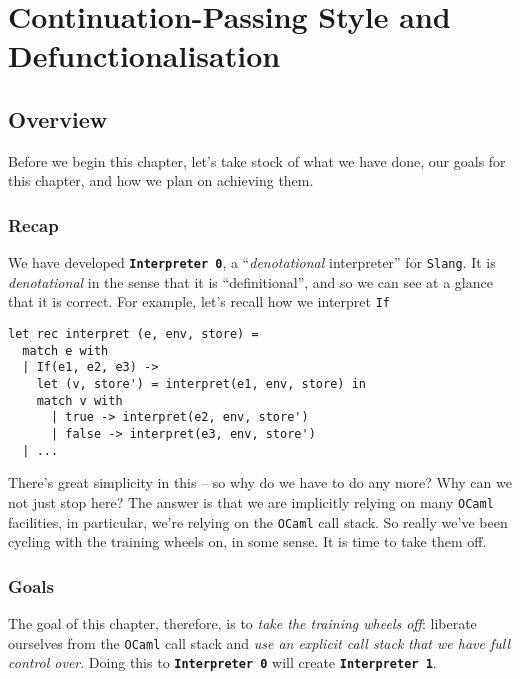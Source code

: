 \chapter{Continuation-Passing Style and Defunctionalisation}



\section{Overview}
Before we begin this chapter, let's take stock of what we have done, our goals for this chapter, and how we plan on achieving them. 

\subsection{Recap}
We have developed \textbf{\texttt{Interpreter 0}}, a ``\emph{denotational} interpreter'' for \texttt{Slang}. It is \emph{denotational} in the sense that it is ``definitional'', and so we can see at a glance that it is correct. For example, let's recall how we interpret \texttt{If}

\begin{code}
\begin{verbatim}
let rec interpret (e, env, store) =
  match e with
  | If(e1, e2, e3) -> 
    let (v, store') = interpret(e1, env, store) in
    match v with 
      | true -> interpret(e2, env, store')
      | false -> interpret(e3, env, store')
  | ...
\end{verbatim}
\end{code}

There's great simplicity in this -- so why do we have to do any more? Why can we not just stop here? The answer is that we are implicitly relying on many \texttt{OCaml} facilities, in particular, we're relying on the \texttt{OCaml} call stack. So really we've been cycling with the training wheels on, in some sense. It is time to take them off. 

\subsection{Goals}
The goal of this chapter, therefore, is to \emph{take the training wheels off}: liberate ourselves from the \texttt{OCaml} call stack and \emph{use an explicit call stack that we have full control over}. Doing this to \textbf{\texttt{Interpreter 0}} will create \textbf{\texttt{Interpreter 1}}.

